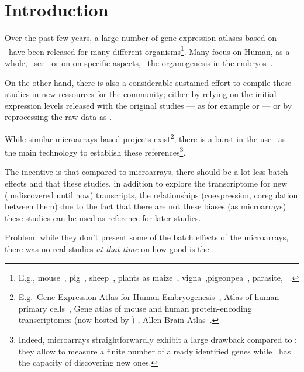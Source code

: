 \chapter*{Introduction}
\label{ch:intro}

Over the past few years, a large number of gene expression atlases based on
\Rnaseq\ have been released for many different organisms\footnote{E.g.,
mouse~, pig~,
sheep~, plants as maize~,
vigna~,pigeonpea~,
parasite, \eg\ .}.
Many focus on Human, as a whole,
\eg\ see~
or on on specific aspects,
\eg\ the organogenesis in the embryos~.

On the other hand, there is also a considerable sustained effort
to compile these studies in new ressources for the community;
either by relying on the initial expression levels released with the original
studies --- as for example
 or
--- or
by reprocessing the raw data as
.

While similar microarrays-based projects exist\footnote{E.g.\ Gene Expression
Atlas for Human Embryogenesis~, Atlas of human primary
cells~, Gene atlas of mouse and human protein-encoding
transcriptomes (now hosted by ) ,
Allen Brain Atlas~.},
there is a burst in the use \Rnaseq\ as the main technology to establish
these references\footnote{Indeed, microarrays straightforwardly exhibit
a large drawback compared to \Rnaseq:
they allow to measure a finite number of already identified genes
while \Rnaseq\ has the capacity of discovering new ones.}.



The incentive is that compared to microarrays, there should be a lot less
batch effects and that these studies, in addition to explore the transcriptome
for new (undiscovered until now) transcripts, the relationships (coexpression,
coregulation between them) due to the fact that there are not these biases (as
microarrays) these studies can be used as reference for later studies.


Problem: while they don't present some of the batch effects of the microarrays,
there was no real studies \emph{at that time} on how good is the \Rnaseq.

